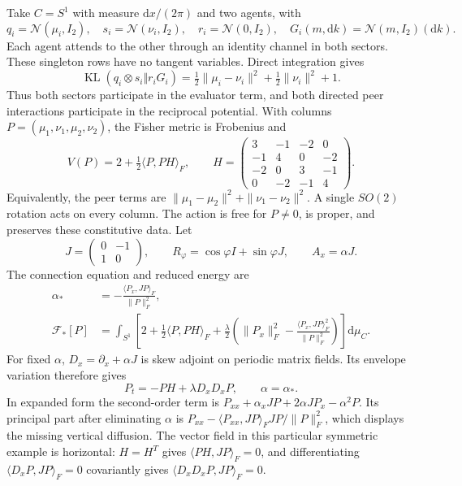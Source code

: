 \documentclass[11pt]{article}
\newcommand{\KL}{\operatorname{KL}}
\newcommand{\dd}{\mathrm d}
\begin{document}
Take $C=S^1$ with measure $\dd x/(2\pi)$ and two agents, with
\begin{equation}
 q_i=\mathcal N(\mu_i,I_2),\quad s_i=\mathcal N(\nu_i,I_2),\quad
 r_i=\mathcal N(0,I_2),\quad G_i(m,\dd k)=\mathcal N(m,I_2)(\dd k).
\end{equation}
Each agent attends to the other through an identity channel in both sectors. These singleton rows have no tangent variables. Direct integration gives
\begin{equation}
 \KL(q_i\otimes s_i\Vert r_iG_i)
 =\tfrac12\|\mu_i-\nu_i\|^2+\tfrac12\|\nu_i\|^2+1.
\end{equation}
Thus both sectors participate in the evaluator term, and both directed peer interactions participate in the reciprocal potential. With columns $P=(\mu_1,\nu_1,\mu_2,\nu_2)$, the Fisher metric is Frobenius and
\begin{equation}
 V(P)=2+\tfrac12\langle P,PH\rangle_F,\qquad
 H=\begin{pmatrix}
 3&-1&-2&0\\-1&4&0&-2\\-2&0&3&-1\\0&-2&-1&4
 \end{pmatrix}.
 \label{eq:witnessV}
\end{equation}
Equivalently, the peer terms are $\|\mu_1-\mu_2\|^2+\|\nu_1-\nu_2\|^2$. A single $SO(2)$ rotation acts on every column. The action is free for $P\ne0$, is proper, and preserves these constitutive data. Let
\begin{equation}
 J=\begin{pmatrix}0&-1\\1&0\end{pmatrix},\qquad
 R_\varphi=\cos\varphi I+\sin\varphi J,\qquad
 A_x=\alpha J.
\end{equation}
The connection equation and reduced energy are
\begin{align}
 \alpha_*&=-\frac{\langle P_x,JP\rangle_F}{\|P\|_F^2},\label{eq:alpha}\\
 \mathcal F_*[P]&=\int_{S^1}\left[
 2+\tfrac12\langle P,PH\rangle_F+
 \frac\lambda2\left(\|P_x\|_F^2-
       \frac{\langle P_x,JP\rangle_F^2}{\|P\|_F^2}\right)\right]\dd\mu_C.
\end{align}
For fixed $\alpha$, $D_x=\partial_x+\alpha J$ is skew adjoint on periodic matrix fields. Its envelope variation therefore gives
\begin{equation}
 \boxed{P_t=-PH+\lambda D_xD_xP,\qquad \alpha=\alpha_*.}
 \label{eq:matrixflow}
\end{equation}
In expanded form the second-order term is
$P_{xx}+\alpha_xJP+2\alpha JP_x-\alpha^2P$.
Its principal part after eliminating $\alpha$ is
$P_{xx}-\langle P_{xx},JP\rangle_FJP/\|P\|_F^2$,
which displays the missing vertical diffusion. The vector field in this particular symmetric example is horizontal: $H=H^T$ gives $\langle PH,JP\rangle_F=0$, and differentiating $\langle D_xP,JP\rangle_F=0$ covariantly gives $\langle D_xD_xP,JP\rangle_F=0$.
\end{document}
